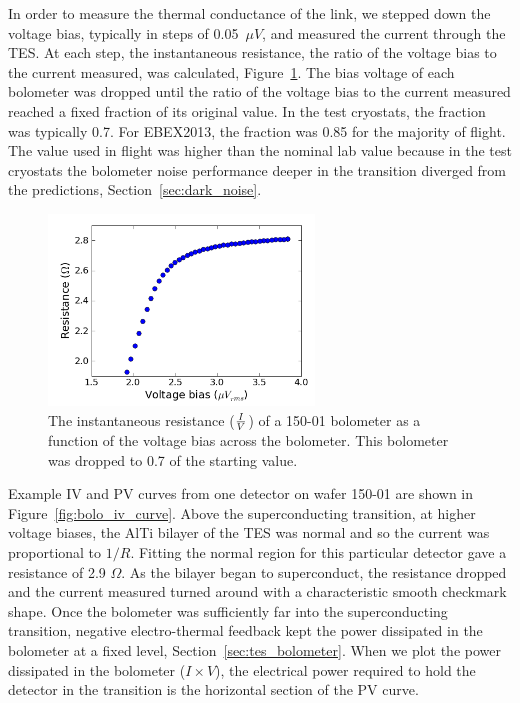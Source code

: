 In order to measure the thermal conductance of the link, 
we stepped down the voltage bias, typically in steps of 0.05~$\mu V$, and measured the current through the \ac{TES}. 
At each step, the instantaneous resistance, the ratio of the voltage bias to the current measured, was calculated, Figure~\ref{fig:bolo_rv_curve}. 
The bias voltage of each bolometer was dropped until the ratio of the voltage bias to the current measured reached a fixed fraction of its original value.
In the test cryostats, the fraction was typically 0.7. 
For \ac{EBEX2013}, the fraction was 0.85 for the majority of flight.
The value used in flight was higher than the nominal lab value because in the test cryostats the bolometer noise performance deeper in the transition diverged from the predictions, Section~\ref{sec:dark_noise}. 

\begin{figure}[htbp]
\begin{center}
\includegraphics[height=2in]{figures/RV_201007301208.png} 
\caption{The instantaneous resistance ($I \over V$) of a 150-01 bolometer as a function of the voltage bias across the bolometer. This bolometer was dropped to 0.7 of the starting value. 
\label{fig:bolo_rv_curve} }
\end{center}
\end{figure}


Example IV and PV curves from one detector on wafer 150-01 are shown in Figure~\ref{fig:bolo_iv_curve}.
Above the superconducting transition, at higher voltage biases, the AlTi bilayer of the \ac{TES} was normal and so the current was proportional to $1/R$. 
Fitting the normal region for this particular detector gave a resistance of 2.9 $\Omega$.
As the bilayer began to superconduct, the resistance dropped and the current measured turned around with a characteristic smooth checkmark shape. 
Once the bolometer was sufficiently far into the superconducting transition, negative electro-thermal feedback kept the power dissipated in the bolometer at a fixed level, Section~\ref{sec:tes_bolometer}.
When we plot the power dissipated in the bolometer ($I \times V$), the electrical power required to hold the detector in the transition is the horizontal section of the PV curve.

